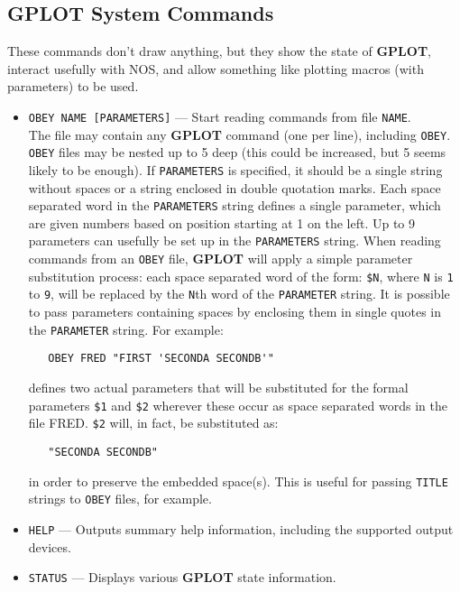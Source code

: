 \documentclass[a4paper,twoside,11pt]{article}
\newcommand{\textttc}[1]{\texttt{\textcolor{OurRed}{#1}}}
\begin{document}
\subsection{\textbf{GPLOT} System Commands}
These commands don't draw anything, but they show the state of \textbf{GPLOT}, interact usefully with NOS, and allow
something like plotting macros (with parameters) to be used.
\begin{itemize}
\item \textttc{OBEY NAME [PARAMETERS]} --- Start reading commands from file \texttt{NAME}.\label{obfile}\\
   The file may contain any \textbf{GPLOT} command (one per line), including \texttt{OBEY}. \texttt{OBEY} files may be
   nested up to 5 deep (this could be increased, but 5 seems likely to be enough). If \texttt{PARAMETERS}
   is specified, it should be a single string without spaces or a string enclosed in double quotation
   marks. Each space separated word in the \texttt{PARAMETERS} string defines a single parameter, which are
   given numbers based on position starting at 1 on the left. Up to 9 parameters can usefully be set up
   in the \texttt{PARAMETERS} string. When reading commands from an \texttt{OBEY} file, \textbf{GPLOT} will apply a simple
   parameter substitution process: each space separated word of the form: \texttt{\$N}, where \texttt{N} 
   is \texttt{1} to \texttt{9}, will
   be replaced by the \texttt{N}th word of the \texttt{PARAMETER} string. It is possible to pass parameters containing spaces
   by enclosing them in single quotes in the \texttt{PARAMETER} string. For example:
   \begin{verbatim}
   OBEY FRED "FIRST 'SECONDA SECONDB'"
   \end{verbatim}
   defines two actual parameters that will be substituted for the formal parameters \texttt{\$1} and \texttt{\$2} wherever
   these occur as space separated words in the file FRED. \texttt{\$2} will, in fact, be substituted as:
   \begin{verbatim}
   "SECONDA SECONDB"
   \end{verbatim}
   in order to preserve the embedded space(s). This is useful for passing \texttt{TITLE} strings to \texttt{OBEY} files,
   for example.
\item \textttc{HELP} --- Outputs summary help information, including the supported output devices.
\item \textttc{STATUS} --- Displays various \textbf{GPLOT} state information.\\

\end{itemize}
\end{document}
